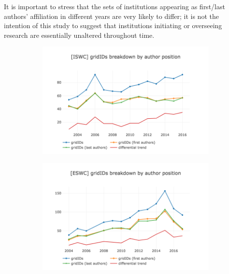 \documentclass{llncs}
\begin{document}
It is important to stress that the sets of institutions appearing as first/last authors' affiliation in different years are very likely to differ; it is not the intention of this study to suggest that institutions initiating or overseeing research are essentially unaltered throughout time.
%
\begin{figure}[t]
\begin{subfigure}{.5\textwidth}
	\centering
	\includegraphics[width=\textwidth]{images/iswc_gridids_vs_authors.png}
	\caption[ ]{}
	\label{fig:iswc_gridids_vs_authors}
\end{subfigure}%
\begin{subfigure}{.5\textwidth}
	\centering
	\includegraphics[width=\textwidth]{images/eswc_gridids_vs_authors.png}
	\caption[ ]{}
	\label{fig:eswc_gridids_vs_authors}
\end{subfigure}
\centering
\begin{subfigure}{.5\textwidth}
	\centering

\end{subfigure}
\end{figure}
\end{document}
